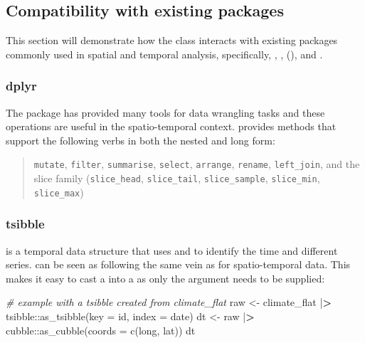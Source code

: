 \documentclass{article}
\newenvironment{Shaded}{\begin{snugshade}}{\end{snugshade}}
\newcommand{\AttributeTok}[1]{\textcolor[rgb]{0.77,0.63,0.00}{#1}}
\newcommand{\CommentTok}[1]{\textcolor[rgb]{0.56,0.35,0.01}{\textit{#1}}}
\newcommand{\ErrorTok}[1]{\textcolor[rgb]{0.64,0.00,0.00}{\textbf{#1}}}
\newcommand{\FunctionTok}[1]{\textcolor[rgb]{0.00,0.00,0.00}{#1}}
\newcommand{\NormalTok}[1]{#1}
\newcommand{\OtherTok}[1]{\textcolor[rgb]{0.56,0.35,0.01}{#1}}
\newcommand{\SpecialCharTok}[1]{\textcolor[rgb]{0.00,0.00,0.00}{#1}}
\begin{document}
\hypertarget{compact}{%
\subsection{Compatibility with existing packages}\label{compact}}

This section will demonstrate how the  class interacts with existing packages commonly used in spatial and temporal analysis, specifically, , ,  (), and .

\hypertarget{dplyr}{%
\subsubsection{dplyr}\label{dplyr}}

The  package has provided many tools for data wrangling tasks and these operations are useful in the spatio-temporal context.  provides methods that support the following  verbs in both the nested and long form:

\begin{quote}
\texttt{mutate}, \texttt{filter}, \texttt{summarise}, \texttt{select}, \texttt{arrange}, \texttt{rename}, \texttt{left\_join}, and the slice family (\texttt{slice\_head}, \texttt{slice\_tail}, \texttt{slice\_sample}, \texttt{slice\_min}, \texttt{slice\_max})
\end{quote}

\hypertarget{tsibble}{%
\subsubsection{tsibble}\label{tsibble}}

 is a temporal data structure that uses  and  to identify the time and different series.  can be seen as following the same vein as  for spatio-temporal data. This makes it easy to cast a  into a  as only the  argument needs to be supplied:

\begin{Shaded}
\begin{Highlighting}[]
\CommentTok{\# example with a tsibble created from climate\_flat}
\NormalTok{raw }\OtherTok{\textless{}{-}}\NormalTok{ climate\_flat }\SpecialCharTok{|}\ErrorTok{\textgreater{}}\NormalTok{ tsibble}\SpecialCharTok{::}\FunctionTok{as\_tsibble}\NormalTok{(}\AttributeTok{key =}\NormalTok{ id, }\AttributeTok{index =}\NormalTok{ date)}
\NormalTok{dt }\OtherTok{\textless{}{-}}\NormalTok{  raw }\SpecialCharTok{|}\ErrorTok{\textgreater{}}\NormalTok{ cubble}\SpecialCharTok{::}\FunctionTok{as\_cubble}\NormalTok{(}\AttributeTok{coords =} \FunctionTok{c}\NormalTok{(long, lat))}
\NormalTok{dt}
\end{Highlighting}
\end{Shaded}
\end{document}
